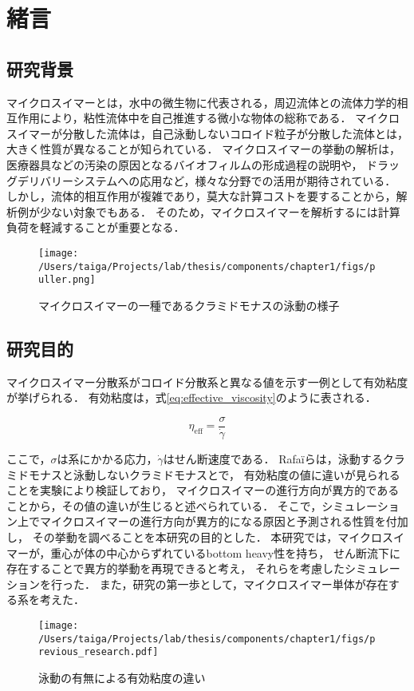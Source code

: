 \documentclass[11pt, a4j, dvipdfmx]{jarticle}
\begin{document}
\section{緒言}
\label{sec:introdction}


\subsection{研究背景}
\par
マイクロスイマーとは，水中の微生物に代表される，周辺流体との流体力学的相互作用により，粘性流体中を自己推進する微小な物体の総称である．
マイクロスイマーが分散した流体は，自己泳動しないコロイド粒子が分散した流体とは，大きく性質が異なることが知られている．
マイクロスイマーの挙動の解析は，医療器具などの汚染の原因となるバイオフィルムの形成過程の説明や，
ドラッグデリバリーシステムへの応用など，様々な分野での活用が期待されている．
しかし，流体的相互作用が複雑であり，莫大な計算コストを要することから，解析例が少ない対象でもある．
そのため，マイクロスイマーを解析するには計算負荷を軽減することが重要となる．

    \begin{figure}[htbp]
        \centering
        \texttt{[image: /Users/taiga/Projects/lab/thesis/components/chapter1/figs/puller.png]}
        \caption{マイクロスイマーの一種であるクラミドモナスの泳動の様子\cite{Chlamydomonas}}
    \end{figure}


\subsection{研究目的}
\label{sec:purpose}

\par
マイクロスイマー分散系がコロイド分散系と異なる値を示す一例として有効粘度が挙げられる．
有効粘度は，式\eqref{eq:effective_viscosity}のように表される．

    \begin{equation}
        \eta_\mathrm{eff} = \frac{\sigma}{\dot{\gamma}}
        \label{eq:effective_viscosity}
    \end{equation}

\noindent
ここで，$\sigma$は系にかかる応力，$\dot{\gamma}$はせん断速度である．
Rafa\"iらは，泳動するクラミドモナスと泳動しないクラミドモナスとで，
有効粘度の値に違いが見られることを実験により検証しており，
マイクロスイマーの進行方向が異方的であることから，その値の違いが生じると述べられている\cite{effective_viscosity}．
そこで，シミュレーション上でマイクロスイマーの進行方向が異方的になる原因と予測される性質を付加し，
その挙動を調べることを本研究の目的とした．
本研究では，マイクロスイマーが，重心が体の中心からずれているbottom heavy性を持ち，
せん断流下に存在することで異方的挙動を再現できると考え，
それらを考慮したシミュレーションを行った．
また，研究の第一歩として，マイクロスイマー単体が存在する系を考えた．

    \begin{figure}[H]
        \centering
        \texttt{[image: /Users/taiga/Projects/lab/thesis/components/chapter1/figs/previous\_research.pdf]}
        \caption{泳動の有無による有効粘度の違い}
    \end{figure}
\end{document}
